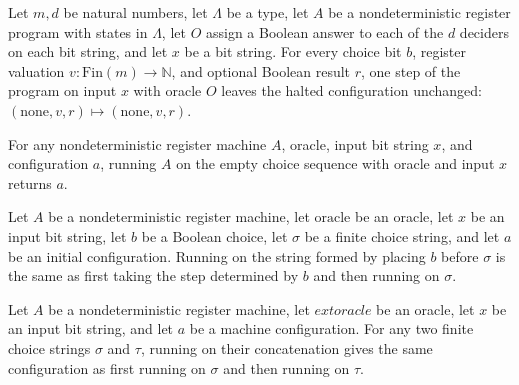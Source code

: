 \begin{lemma}
\label{Complexity.LogProg.nastep_none}
\leanok
{}
Let $m,d$ be natural numbers, let $\Lambda$ be a type, let $A$ be a nondeterministic
register program with states in $\Lambda$, let $O$ assign a Boolean answer to each
of the $d$ deciders on each bit string, and let $x$ be a bit string. For every choice
bit $b$, register valuation $v : \mathrm{Fin}(m) \to \mathbb{N}$, and optional
Boolean result $r$, one step of the program on input $x$ with oracle $O$ leaves the
halted configuration unchanged: $(\mathrm{none},v,r) \mapsto (\mathrm{none},v,r)$.
\end{lemma}

\begin{lemma}
\label{Complexity.LogProg.narun_nil}
\leanok
{}
For any nondeterministic register machine $A$, oracle, input bit string $x$, and
configuration $a$, running $A$ on the empty choice sequence with oracle and input $x$
returns $a$.
\end{lemma}

\begin{lemma}
\label{Complexity.LogProg.narun_cons}
\leanok
{}
Let $A$ be a nondeterministic register machine, let $\text{oracle}$ be an oracle, let
$x$ be an input bit string, let $b$ be a Boolean choice, let $\sigma$ be a finite choice
string, and let $a$ be an initial configuration. Running on the string formed by placing
$b$ before $\sigma$ is the same as first taking the step determined by $b$ and then
running on $\sigma$.
\end{lemma}

\begin{lemma}
\label{Complexity.LogProg.narun_append}
\leanok
{}
Let $A$ be a nondeterministic register machine, let $	ext{oracle}$ be an oracle, let $x$
be an input bit string, and let $a$ be a machine configuration. For any two finite
choice strings $\sigma$ and $\tau$, running on their concatenation gives the same
configuration as first running on $\sigma$ and then running on $\tau$.
\end{lemma}

